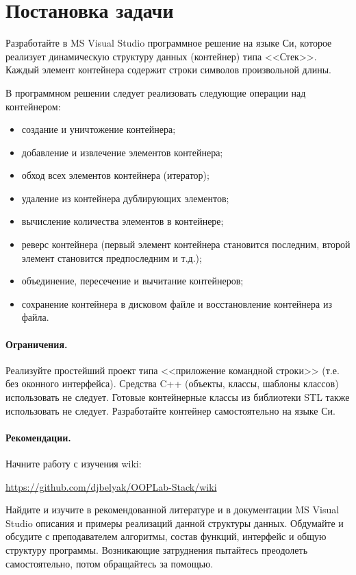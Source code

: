 \section{Постановка задачи}

Разработайте в MS Visual Studio программное решение на языке Си, которое реализует динамическую структуру данных (контейнер) типа <<Стек>>. 
Каждый элемент контейнера содержит строки символов произвольной длины. 

В программном решении следует реализовать следующие операции над контейнером: 
\begin{itemize}
\item создание и уничтожение контейнера; 
\item  добавление и извлечение элементов контейнера; 
\item  обход всех элементов контейнера (итератор); 
\item удаление из контейнера дублирующих элементов; 
\item  вычисление количества элементов в контейнере; 
\item  реверс контейнера (первый элемент контейнера становится последним, второй элемент становится предпоследним и т.д.); 
\item  объединение, пересечение и вычитание контейнеров; 
\item  сохранение контейнера в дисковом файле и восстановление контейнера из файла. 
\end{itemize}

\paragraph{Ограничения.}

Реализуйте простейший проект типа <<приложение командной строки>> (т.е. без оконного интерфейса). 
Средства C++ (объекты, классы, шаблоны классов) использовать не следует. 
Готовые контейнерные классы из библиотеки STL также использовать не следует. Разработайте контейнер самостоятельно на языке Си. 

\paragraph{Рекомендации.}
 Начните работу с изучения wiki:

 \href{https://github.com/djbelyak/OOPLab-Stack/wiki}{https://github.com/djbelyak/OOPLab-Stack/wiki}

Найдите и изучите в рекомендованной литературе и в документации MS Visual Studio описания и примеры реализаций данной структуры данных. 
Обдумайте и обсудите с преподавателем алгоритмы, состав функций, интерфейс и общую структуру программы. 
Возникающие затруднения пытайтесь преодолеть самостоятельно, потом обращайтесь за помощью. 


